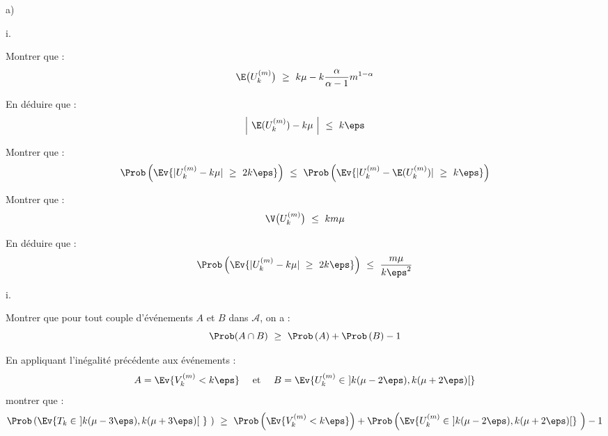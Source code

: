 \begin{liste}{a)}
  \setcounter{enumi}{6}
\item
  \begin{nonoliste}{i.}
  \item Montrer que :
    \[
    \E\big(U_{k}^{(m)} \big) \ \geq \ k \mu - k
    \dfrac{\alpha}{\alpha-1} m^{1-\alpha}
    \]

    

  \item En déduire que :
    \[
    \left| \ \E(U_{k}^{(m)}) -k \mu \ \right| \ \leq \  k \eps
    \]

    




  \item Montrer que :
    \[
    \Prob\left(\Ev{ |U_{k}^{(m)} - k \mu| \ \geq \ 2k \eps}\right) \
    \leq \ \Prob\left(\Ev{ |U_{k}^{(m)} - \E(U_{k}^{(m)})| \ \geq \ k
        \eps}\right)
    \]

    

  \item Montrer que :
    \[
    \V\big(U_{k}^{(m)} \big) \ \leq \ km \mu
    \]

    

  \item En déduire que :
    \[
    \Prob\left(\Ev{ |U_{k}^{(m)} - k \mu| \ \geq \  2k \eps}\right) \ \leq
    \ \dfrac{m \mu}{k \eps^{2}}
    \]

    
  \end{nonoliste}

\item
  \begin{nonoliste}{i.}
  \item Montrer que pour tout couple d'événements $A$ et $B$ dans
    $\mathcal{A}$, on a :
    \[
    \Prob(A \cap B) \ \geq \  \Prob\left(A\right) + \Prob\left(B \right)-1
    \]

    




  \item En appliquant l'inégalité précédente aux événements :
    \[
    A = \Ev{V_{k}^{(m)} < k \eps} \quad \text{ et } \quad B =
    \Ev{U_{k}^{(m)} \in \ ] k(\mu - 2 \eps), k(\mu + 2 \eps)[ }
    \]
    montrer que :
    \[
    \Prob\left(\Ev{T_{k} \in \ ]k(\mu - 3 \eps), k(\mu + 3 \eps)[ \ }
      \ \right) \ \geq \ \Prob\left(\Ev{ V_{k}^{(m)} < k \eps}\right)
    + \Prob\left(\Ev{U_{k}^{(m)} \in \ ]k(\mu - 2 \eps), k(\mu + 2
        \eps)[} \ \right) - 1
    \]


\end{nonoliste}
\end{liste}
